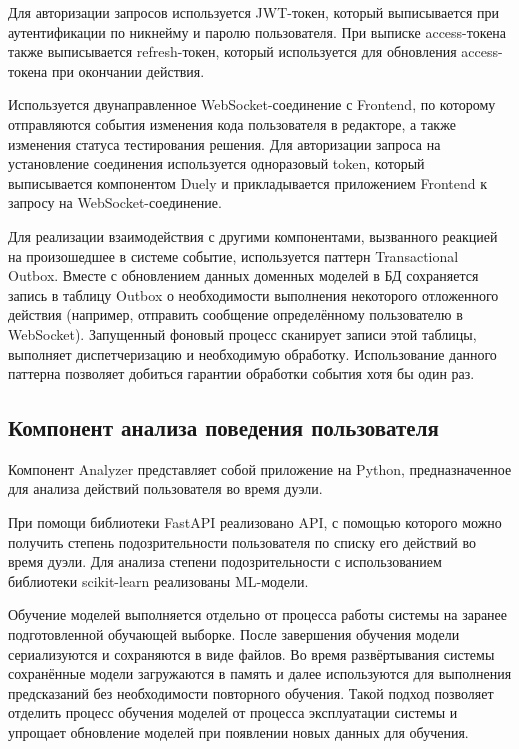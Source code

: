 Для авторизации запросов используется JWT-токен, который выписывается при аутентификации по никнейму и паролю пользователя.
При выписке access-токена также выписывается refresh-токен, который используется для обновления access-токена при окончании действия.

Используется двунаправленное WebSocket-соединение с Frontend,
по которому отправляются события изменения кода пользователя в редакторе, а также изменения статуса тестирования решения.
Для авторизации запроса на установление соединения используется одноразовый token,
который выписывается компонентом Duely и прикладывается приложением Frontend к запросу на WebSocket-соединение.

Для реализации взаимодействия с другими компонентами, вызванного реакцией на произошедшее в системе событие,
используется паттерн Transactional Outbox.
Вместе с обновлением данных доменных моделей в БД сохраняется запись в таблицу Outbox
о необходимости выполнения некоторого отложенного действия (например, отправить сообщение определённому пользователю в WebSocket).
Запущенный фоновый процесс сканирует записи этой таблицы, выполняет диспетчеризацию и необходимую обработку.
Использование данного паттерна позволяет добиться гарантии обработки события хотя бы один раз.

\subsection{Компонент анализа поведения пользователя}

Компонент Analyzer представляет собой приложение на Python, предназначенное для анализа действий пользователя во время дуэли.

При помощи библиотеки FastAPI реализовано API,
с помощью которого можно получить степень подозрительности пользователя по списку его действий во время дуэли.
Для анализа степени подозрительности с использованием библиотеки scikit-learn реализованы ML-модели.

Обучение моделей выполняется отдельно от процесса работы системы на заранее подготовленной обучающей выборке.
После завершения обучения модели сериализуются и сохраняются в виде файлов.
Во время развёртывания системы сохранённые модели загружаются в память
и далее используются для выполнения предсказаний без необходимости повторного обучения.
Такой подход позволяет отделить процесс обучения моделей от процесса эксплуатации системы
и упрощает обновление моделей при появлении новых данных для обучения.

